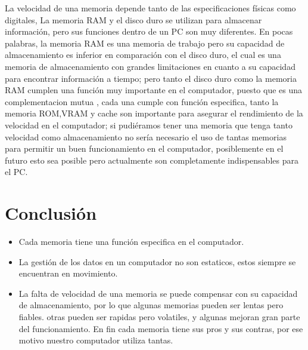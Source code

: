 \documentclass[12pt,oneside]{book}
\begin{document}
La velocidad de una memoria depende tanto de las especificaciones físicas como digitales, La memoria RAM y el disco duro se utilizan para almacenar información, pero sus funciones dentro de un PC son muy diferentes. En pocas palabras, la memoria RAM es una memoria de trabajo pero su capacidad de almacenamiento es inferior en comparación con el disco duro, el cual es una memoria de almacenamiento con grandes limitaciones en cuanto a su capacidad para encontrar información a tiempo; pero tanto el disco duro como la memoria RAM cumplen una función muy importante en el computador, puesto que es una complementacion mutua , cada una cumple con función especifica, tanto la memoria ROM,VRAM y cache son importante para asegurar el rendimiento de la velocidad en el computador; si pudiéramos tener una memoria que tenga  tanto velocidad como almacenamiento no sería necesario el uso de tantas memorias  para permitir un buen funcionamiento en el computador, posiblemente en el futuro esto sea posible pero actualmente son completamente indispensables para el PC.



\section{Conclusión} \label{conclulsion}
 \begin{itemize}
\item Cada memoria tiene una función especifica en el computador.
\item La gestión de los datos en un computador no son estaticos, estos siempre se encuentran en movimiento.

\item La falta de velocidad de una memoria se puede compensar con su capacidad de almacenamiento, por lo que algunas memorias pueden ser lentas pero fiables. otras pueden ser rapidas pero volatiles, y algunas mejoran gran parte del funcionamiento. En fin cada memoria tiene sus pros y sus contras, por ese motivo nuestro computador  utiliza tantas.

\end{itemize}

\newpage



\end{document}

